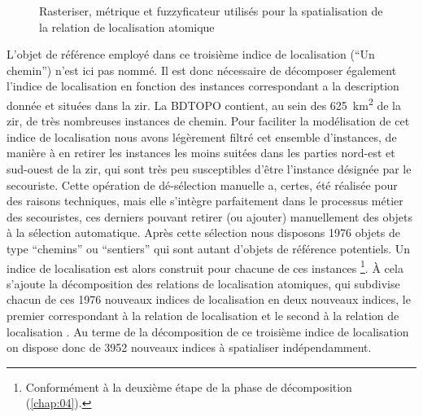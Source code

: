\begin{figure}
  \centering
  
  \caption{Rasteriser, métrique et fuzzyficateur utilisés pour la
    spatialisation de la relation de localisation atomique
    \protect{}}
  \label{fig:ex_parties_statialisation_Proximal}
\end{figure}

L'objet de référence employé dans ce troisième indice de localisation
(\enquote{Un chemin}) n'est ici pas nommé. Il est donc nécessaire de
décomposer également l'indice de localisation en fonction des
instances correspondant a la description donnée et situées dans la
\ac{zir}. La BDTOPO contient, au sein des
\SI{625}{\kilo\meter\squared} de la \ac{zir}, de très nombreuses
instances de chemin. Pour faciliter la modélisation de cet indice de
localisation nous avons légèrement filtré cet ensemble d'instances, de
manière à en retirer les instances les moins suitées dans les parties
nord-est et sud-ouest de la \ac{zir}, qui sont très peu susceptibles
d'être l'instance désignée par le secouriste. Cette opération de
dé-sélection manuelle a, certes, été réalisée pour des raisons
techniques, mais elle s'intègre parfaitement dans le processus métier
des secouristes, ces derniers pouvant retirer (ou ajouter)
manuellement des objets à la sélection automatique. Après cette
sélection nous disposons \num{1976} objets de type \enquote{chemins}
ou \enquote{sentiers} qui sont autant d'objets de référence
potentiels. Un indice de localisation est alors construit pour chacune
de ces instances \footnote{Conformément à la deuxième étape de la
  phase de décomposition (\autoref{chap:04}).}. À cela s'ajoute la
décomposition des relations de localisation atomiques, qui subdivise
chacun de ces \num{1976} nouveaux indices de localisation en deux
nouveaux indices, le premier correspondant à la relation de
localisation  et le second à la relation de
localisation . Au terme de la décomposition de ce
troisième indice de localisation on dispose donc de \num{3952}
nouveaux indices à spatialiser indépendamment.

